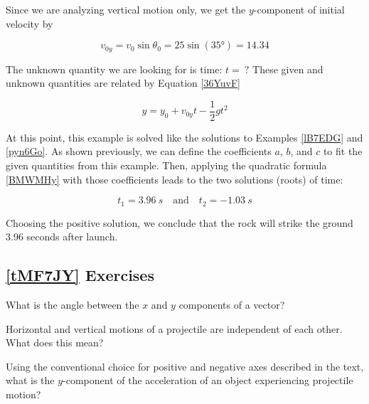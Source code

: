 \documentclass[dvipsnames]{article}
\numberwithin{equation}{section}
\numberwithin{figure}{section}
\begin{document}
\vspace{1em}

Since we are analyzing vertical motion only, we get the $y$-component of initial velocity by

\begin{equation*}
    v_{0y} = v_0 \sin{\theta_0} = 25 \sin{(\ang{35})} = 14.34
\end{equation*}

 The unknown quantity we are looking for is time: $t =\ ?$ These given and unknown quantities are related by Equation \eqref{36YuvF}

\begin{equation*}
    y = y_0 + v_{0y}t - \frac{1}{2} g t^2
\end{equation*}

At this point, this example is solved like the solutions to Examples \ref{lB7EDG} and \ref{pyn6Go}. As shown previously, we can define the coefficients $a$, $b$, and $c$ to fit the given quantities from this example. Then, applying the quadratic formula \eqref{BMWMHy} with those coefficients leads to the two solutions (roots) of time:

\begin{equation*}
    t_1 = \SI{3.96}{s} \quad \text{and} \quad t_2 = \SI{-1.03}{s}
\end{equation*}

Choosing the positive solution, we conclude that the rock will strike the ground 3.96 seconds after launch.

\subsection*{\ref{tMF7JY} Exercises}

\begin{exercise} \label{90PABl}
    What is the angle between the $x$ and $y$ components of a vector?
\end{exercise}

\begin{exercise}
    Horizontal and vertical motions of a projectile are independent of each other. What does this mean?
\end{exercise}

\begin{exercise} \label{YYBBp5}
    Using the conventional choice for positive and negative axes described in the text, what is the $y$-component of the acceleration of an object experiencing projectile motion?
\end{exercise}
\end{document}
